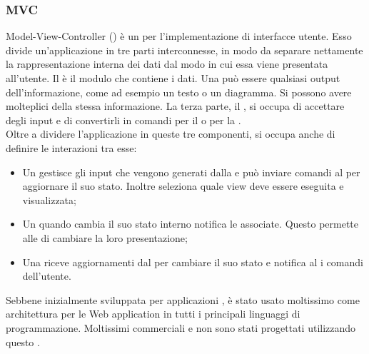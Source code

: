 \documentclass[12pt,a4paper]{article}
\begin{document}
\subsubsection{MVC}
Model-View-Controller () è un  per l’implementazione di interfacce utente. Esso divide un’applicazione  in tre parti interconnesse, in modo da separare nettamente la rappresentazione interna dei dati dal modo in cui essa viene presentata all’utente. Il  è il modulo che contiene i dati. Una  può essere qualsiasi output dell’informazione, come ad esempio un testo o un diagramma. Si possono avere molteplici  della stessa informazione. La terza parte, il , si occupa di accettare degli input e di convertirli in comandi per il  o per la .\\
Oltre a dividere l’applicazione in queste tre componenti,  si occupa anche di definire le interazioni tra esse:
\begin{itemize}
	\item Un  gestisce gli input che vengono generati dalla  e può inviare comandi al  per aggiornare il suo stato. Inoltre seleziona quale view deve essere eseguita e visualizzata;
	\item Un  quando cambia il suo stato interno notifica le  associate. Questo permette alle  di cambiare la loro presentazione;
	\item Una  riceve aggiornamenti dal  per cambiare il suo stato e notifica al  i comandi dell'utente.
\end{itemize}

Sebbene inizialmente sviluppata per applicazioni ,  è stato usato moltissimo come architettura per le Web application in tutti i principali linguaggi di programmazione. Moltissimi  commerciali e non sono stati progettati utilizzando questo .
\end{document}
